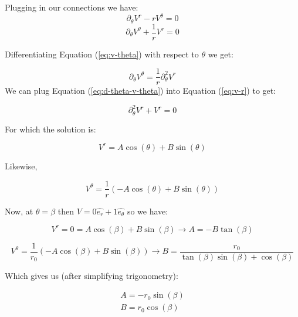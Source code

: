 \documentclass{article}
\begin{document}
Plugging in our connections we have:
\begin{equation}
\partial_{\theta}V^{r}-rV^{\theta}=0 \label{eq:v-theta}
\end{equation}
\begin{equation}
\partial_{\theta}V^{\theta}+\frac{1}{r}V^{r}=0 \label{eq:v-r}
\end{equation}

Differentiating Equation (\ref{eq:v-theta}) with respect to $\theta$ we get:

\begin{equation}
\partial_{\theta}V^{\theta}=\frac{1}{r}\partial^{2}_{\theta}V^{r} \label{eq:d-theta-v-theta}
\end{equation}
We can plug Equation (\ref{eq:d-theta-v-theta}) into Equation (\ref{eq:v-r}) to get:

\begin{equation}
\partial^{2}_{\theta}V^{r}+V^{r}=0
\end{equation}

For which the solution is:

\begin{equation}
V^{r}=A\cos(\theta)+B\sin(\theta)
\end{equation}

Likewise,

\begin{equation}
V^{\theta}=\frac{1}{r}\left(-A\cos(\theta)+B\sin(\theta)\right)
\end{equation}

Now, at $\theta=\beta$ then $V=0\hat{e_{r}}+1\hat{e_{\theta}}$ so we have:

\begin{equation}
V^{r}=0=A\cos(\beta)+B\sin(\beta)\rightarrow A=-B\tan(\beta)
\end{equation}

\begin{equation}
V^{\theta}=\frac{1}{r_{0}}\left(-A\cos(\beta)+B\sin(\beta)\right)\rightarrow B=\frac{r_{0}}{\tan(\beta)\sin(\beta)+\cos(\beta)}
\end{equation}

Which gives us (after simplifying trigonometry):

\begin{equation}
\begin{array}{l}
A=-r_{0}\sin(\beta) \\
B=r_{0}\cos(\beta)
\end{array}
\end{equation}
\end{document}
